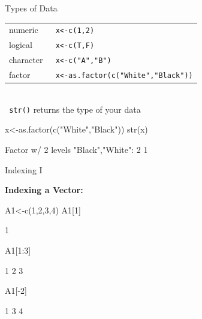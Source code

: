 \documentclass[11pt,german,hideothersubsections]{beamer}
\newcommand{\R}[1]{{\tt \color{blue}  #1}}
\begin{document}
\begin{frame}[fragile]{Types of Data}
\begin{tabular}{l l}
numeric & \R{x<-c(1,2)}\\
logical & \R{x<-c(T,F)}\\
character & \R{x<-c("A","B")}\\
factor & \R{x<-as.factor(c("White","Black"))}\\
\end{tabular}\\
\vspace{.25cm}
\R{str()} returns the type of your data
\begin{Schunk}
\begin{Sinput}
 x<-as.factor(c("White","Black"))
 str(x)
\end{Sinput}
\begin{Soutput}
 Factor w/ 2 levels "Black","White": 2 1
\end{Soutput}
\end{Schunk}
\end{frame}
\begin{frame}[fragile]{Indexing I}
\begin{center}
\textbf{Indexing a Vector:}
\end{center}
\begin{Schunk}
\begin{Sinput}
 A1<-c(1,2,3,4)
 A1[1]
\end{Sinput}
\begin{Soutput}
[1] 1
\end{Soutput}
\begin{Sinput}
 A1[1:3]
\end{Sinput}
\begin{Soutput}
[1] 1 2 3
\end{Soutput}
\begin{Sinput}
 A1[-2]
\end{Sinput}
\begin{Soutput}
[1] 1 3 4
\end{Soutput}
\end{Schunk}
\end{frame}
\end{document}
